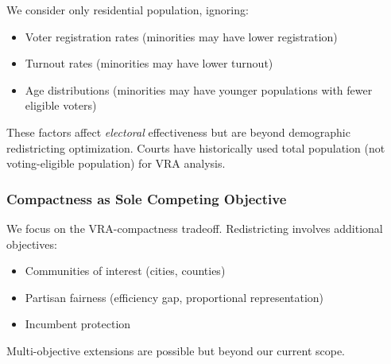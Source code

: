 We consider only residential population, ignoring:
\begin{itemize}
    \item Voter registration rates (minorities may have lower registration)
    \item Turnout rates (minorities may have lower turnout)
    \item Age distributions (minorities may have younger populations with fewer eligible voters)
\end{itemize}

These factors affect \emph{electoral} effectiveness but are beyond demographic redistricting optimization. Courts have historically used total population (not voting-eligible population) for VRA analysis.

\subsubsection{Compactness as Sole Competing Objective}

We focus on the VRA-compactness tradeoff. Redistricting involves additional objectives:
\begin{itemize}
    \item Communities of interest (cities, counties)
    \item Partisan fairness (efficiency gap, proportional representation)
    \item Incumbent protection
\end{itemize}

Multi-objective extensions are possible but beyond our current scope.
